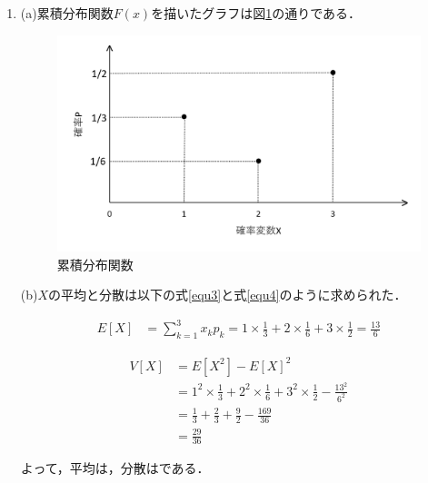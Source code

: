 \documentclass[a4paper,10pt]{jarticle}
\begin{document}
\begin{enumerate}
	\setlength{\itemsep}{-2mm}
	 \item (a)累積分布関数$F(x)$を描いたグラフは図\ref*{apara}の通りである．
	 
	 \begin{figure}[ht]
		\begin{center}
		 \includegraphics[scale=1.0]{zu1.png}
		 \caption{累積分布関数}
		 \label{apara}
		\end{center}
		\end{figure}

				(b)$X$の平均と分散は以下の式\ref*{equ3}と式\ref*{equ4}のように求められた．

	\begin{equation}
		\label{equ3}
		\begin{split}
			E[X] &= \sum_{k = 1}^{3}x_{k} p_{k} = 1 \times \frac{1}{3} + 2 \times \frac{1}{6} + 3 \times \frac{1}{2} = \frac{13}{6}
		\end{split}
	\end{equation}

	\begin{equation}
		\label{equ4}
		\begin{split}
			V[X] &= E[X^2]-{E[X]}^2 \\
					 &= 1^2 \times \frac{1}{3} +2^2 \times \frac{1}{6} +3^2 \times \frac{1}{2} - \frac{13^2}{6^2} \\
					 &= \frac{1}{3}+\frac{2}{3}+\frac{9}{2}-\frac{169}{36} \\
					 &= \frac{29}{36}
		\end{split}
	\end{equation}

	よって，平均は，分散はである．
		\vspace{6mm}


\end{enumerate}
\end{document}
